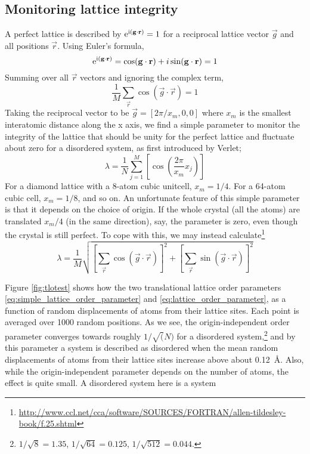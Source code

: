 \documentclass[11pt,bibliography=totoc,index=totoc]{scrbook}   %
\begin{document}
%
\subsection{Monitoring lattice integrity}
%

A perfect lattice is described by $\mathrm{e}^{\mathrm{i}(\boldsymbol{\mathrm{g}}\cdot\boldsymbol{\mathrm{r}})}=1$ for a reciprocal lattice vector $\vec{g}$ and all positions $\vec{r}$. 
Using Euler's formula,
\begin{equation}
    \mathrm{e}^{\mathrm{i}(\boldsymbol{\mathrm{g}}\cdot\boldsymbol{\mathrm{r}})} = \cos(\boldsymbol{\mathrm{g}}\cdot\boldsymbol{\mathrm{r}}) + i\sin(\boldsymbol{\mathrm{g}}\cdot\boldsymbol{\mathrm{r}}) = 1
\end{equation}
Summing over all $\vec{r}$ vectors and ignoring the complex term,
\begin{equation}
    \frac{1}{M}\sum_{\vec{r}} \cos(\vec{g}\cdot\vec{r}) = 1
\end{equation}
Taking the reciprocal vector to be $\vec{g}=[2\pi/x_m,0,0]$ where $x_m$ is the smallest interatomic distance along the x axis, we find a simple parameter to monitor the integrity of the lattice that should be unity for the perfect lattice and fluctuate about zero for a disordered system, as first introduced by Verlet;
\begin{equation}
  \lambda = \frac{1}{N} \sum_{j=1}^M  \left[ \cos\left( \frac{2\pi}{x_m} x_j \right)\right]
  \label{eq:simple_lattice_order_parameter}
\end{equation}
For a diamond lattice with a 8-atom cubic unitcell, $x_m=1/4$. For a 64-atom cubic cell, $x_m=1/8$, and so on.
An unfortunate feature of this simple parameter is that it depends on the choice of origin. 
If the whole crystal (all the atoms) are translated $x_m/4$ (in the same direction), say, the parameter is zero, even though the crystal is still perfect.
To cope with this, we may instead calculate\footnote{\url{http://www.ccl.net/cca/software/SOURCES/FORTRAN/allen-tildesley-book/f.25.shtml}}
\begin{equation}
  \lambda = \frac{1}{M}\sqrt{\left[\sum_{\vec{r}}\cos(\vec{g}\cdot\vec{r})\right]^2 + \left[\sum_{\vec{r}}\sin(\vec{g}\cdot\vec{r})\right]^2}
  \label{eq:lattice_order_parameter}
\end{equation}

Figure \ref{fig:tlotest} shows how the two translational lattice order parameters \eqref{eq:simple_lattice_order_parameter} and \eqref{eq:lattice_order_parameter}, as a function of random displacements of atoms from their lattice sites. Each point is averaged over 1000 random positions. 
As we see, the origin-independent order parameter converges towards roughly $1/\sqrt(N)$ for a disordered system,\footnote{$1/\sqrt{8}=1.35$, $1/\sqrt{64}=0.125$, $1/\sqrt{512}=0.044$.}
and by this parameter a system is described as disordered when the mean random displacements of atoms from their lattice sites increase above about 0.12~Å.
Also, while the origin-independent parameter depends on the number of atoms, the effect is quite small.
A disordered system here is a system 
\end{document}
